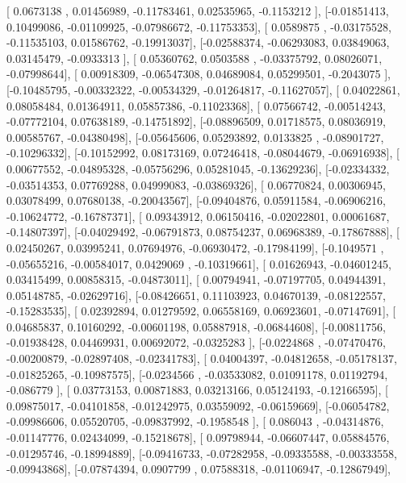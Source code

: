 \documentclass{article}
\begin{document}
       [ 0.0673138 ,  0.01456989, -0.11783461,  0.02535965, -0.1153212 ],
       [-0.01851413,  0.10499086, -0.01109925, -0.07986672, -0.11753353],
       [ 0.0589875 , -0.03175528, -0.11535103,  0.01586762, -0.19913037],
       [-0.02588374, -0.06293083,  0.03849063,  0.03145479, -0.0933313 ],
       [ 0.05360762,  0.0503588 , -0.03375792,  0.08026071, -0.07998644],
       [ 0.00918309, -0.06547308,  0.04689084,  0.05299501, -0.2043075 ],
       [-0.10485795, -0.00332322, -0.00534329, -0.01264817, -0.11627057],
       [ 0.04022861,  0.08058484,  0.01364911,  0.05857386, -0.11023368],
       [ 0.07566742, -0.00514243, -0.07772104,  0.07638189, -0.14751892],
       [-0.08896509,  0.01718575,  0.08036919,  0.00585767, -0.04380498],
       [-0.05645606,  0.05293892,  0.0133825 , -0.08901727, -0.10296332],
       [-0.10152992,  0.08173169,  0.07246418, -0.08044679, -0.06916938],
       [ 0.00677552, -0.04895328, -0.05756296,  0.05281045, -0.13629236],
       [-0.02334332, -0.03514353,  0.07769288,  0.04999083, -0.03869326],
       [ 0.06770824,  0.00306945,  0.03078499,  0.07680138, -0.20043567],
       [-0.09404876,  0.05911584, -0.06906216, -0.10624772, -0.16787371],
       [ 0.09343912,  0.06150416, -0.02022801,  0.00061687, -0.14807397],
       [-0.04029492, -0.06791873,  0.08754237,  0.06968389, -0.17867888],
       [ 0.02450267,  0.03995241,  0.07694976, -0.06930472, -0.17984199],
       [-0.1049571 , -0.05655216, -0.00584017,  0.0429069 , -0.10319661],
       [ 0.01626943, -0.04601245,  0.03415499,  0.00858315, -0.04873011],
       [ 0.00794941, -0.07197705,  0.04944391,  0.05148785, -0.02629716],
       [-0.08426651,  0.11103923,  0.04670139, -0.08122557, -0.15283535],
       [ 0.02392894,  0.01279592,  0.06558169,  0.06923601, -0.07147691],
       [ 0.04685837,  0.10160292, -0.00601198,  0.05887918, -0.06844608],
       [-0.00811756, -0.01938428,  0.04469931,  0.00692072, -0.0325283 ],
       [-0.0224868 , -0.07470476, -0.00200879, -0.02897408, -0.02341783],
       [ 0.04004397, -0.04812658, -0.05178137, -0.01825265, -0.10987575],
       [-0.0234566 , -0.03533082,  0.01091178,  0.01192794, -0.086779  ],
       [ 0.03773153,  0.00871883,  0.03213166,  0.05124193, -0.12166595],
       [ 0.09875017, -0.04101858, -0.01242975,  0.03559092, -0.06159669],
       [-0.06054782, -0.09986606,  0.05520705, -0.09837992, -0.1958548 ],
       [ 0.086043  , -0.04314876, -0.01147776,  0.02434099, -0.15218678],
       [ 0.09798944, -0.06607447,  0.05884576, -0.01295746, -0.18994889],
       [-0.09416733, -0.07282958, -0.09335588, -0.00333558, -0.09943868],
       [-0.07874394,  0.0907799 ,  0.07588318, -0.01106947, -0.12867949],
\end{document}
